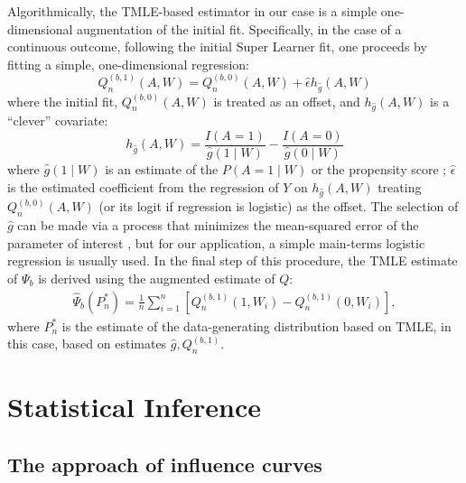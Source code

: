 Algorithmically, the TMLE-based estimator in our case is a simple
one-dimensional augmentation of the initial fit. Specifically, in the case of
a continuous outcome, following the initial Super Learner fit, one proceeds by
fitting a simple, one-dimensional regression:
$$
Q^{(b, 1)}_n(A, W) = Q^{(b, 0)}_n(A, W) + \hat{\epsilon} h_{\hat{g}}(A, W)
$$
where the initial fit, $Q^{(b, 0)}_n(A, W)$ is treated as an offset, and
$h_{\hat{g}}(A, W)$ is a ``clever'' covariate:
$$
h_{\hat{g}}(A, W) = \frac{I(A = 1)}{\hat{g}(1 \mid W)} -
\frac{I(A = 0)}{\hat{g}(0 \mid W)}
$$
where $\hat{g}(1 \mid W)$ is an estimate of the $P(A = 1 \mid W)$ or the
propensity score \cite{rosenbaum1983central}; $\hat{\epsilon}$ is the estimated
coefficient from the regression of $Y$ on $h_{\hat{g}}(A, W)$ treating
$Q^{(b, 0)}_n(A, W)$ (or its logit if regression is logistic) as the offset.
The selection of $\hat{g}$ can be made via a process that minimizes the
mean-squared error of the parameter of interest \cite{gruber2010application},
but for our application, a simple main-terms logistic regression is usually
used. In the final step of this procedure, the TMLE estimate of $\Psi_b$ is
derived using the augmented estimate of $Q$:
\begin{eqnarray}
  \hat{\Psi}_b(P^*_n) = \frac{1}{n}\sum^{n}_{i = 1}[Q^{(b, 1)}_n(1, W_i) -
  Q^{(b, 1)}_{n}(0, W_i)],
\end{eqnarray}
where $P^*_n$ is the estimate of the data-generating distribution based on
TMLE, in this case, based on estimates $\hat{g},Q^{(b,1)}_n$.

\section{Statistical Inference}\label{inference}

\subsection{The approach of influence curves}\label{ic}

